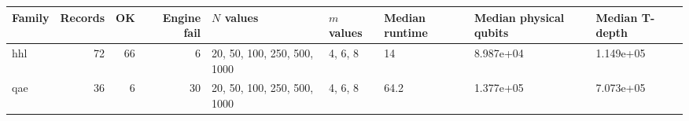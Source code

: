 \begin{tabular}{lrrrlllll}
\toprule
Family & Records & OK & Engine fail & $N$ values & $m$ values & Median runtime & Median physical qubits & Median T-depth \\
\midrule
hhl & 72 & 66 & 6 & 20, 50, 100, 250, 500, 1000 & 4, 6, 8 & 14 & 8.987e+04 & 1.149e+05 \\
qae & 36 & 6 & 30 & 20, 50, 100, 250, 500, 1000 & 4, 6, 8 & 64.2 & 1.377e+05 & 7.073e+05 \\
\bottomrule
\end{tabular}
